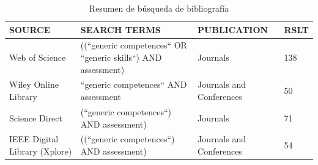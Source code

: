 \begin{table}
  \begin{center}
  \begin{tabular}{| p{2.8cm} | p{5.5cm} | p{3cm} | p{0.8cm} |}
    \hline
    SOURCE & SEARCH TERMS & PUBLICATION & RSLT \\
    \hline
    \hline
    Web of Science & ((``generic competences`` OR ``generic skills``) AND assessment) & Journals & 138 \\
    \hline
    Wiley Online Library & ``generic competences`` AND assessment & Journals and Conferences & 50 \\
    \hline
    Science Direct & (``generic competences``) AND assessment) & Journals & 71 \\
    \hline
    IEEE Digital Library (Xplore) & ((``generic competences``) AND assessment) & Journals and Conferences & 54 \\
    \hline

    \hline
  \end{tabular}
\end{center}
\caption{Resumen de búsqueda de bibliografía}
\label{tab:ResumenBusqueda}
\end{table} 

